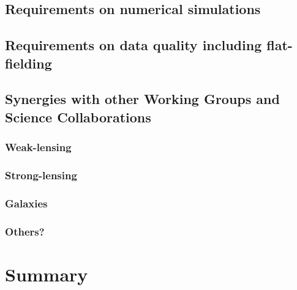 \documentclass[a4paper,11pt]{article}
\begin{document}
\subsection{Requirements on numerical simulations}

\subsection{Requirements on data quality including flat-fielding}

\subsection{Synergies with other Working Groups and Science Collaborations}

\subsubsection{Weak-lensing}

\subsubsection{Strong-lensing}

\subsubsection{Galaxies}

\subsubsection{Others?}

\section{Summary}
\end{document}
